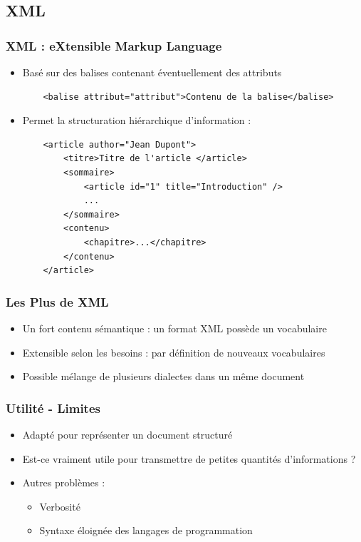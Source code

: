 \documentclass{beamer}
\begin{document}
    \subsection{XML}
        \begin{frame}[containsverbatim]
            \frametitle{XML : eXtensible Markup Language}
            \begin{itemize}
                \item \normalsize Basé sur des balises contenant éventuellement des attributs
                \footnotesize
                \begin{verbatim}    <balise attribut="attribut">Contenu de la balise</balise> \end{verbatim}
                \item \normalsize Permet la structuration hiérarchique d'information :
                \footnotesize
                \begin{verbatim}
    <article author="Jean Dupont">
        <titre>Titre de l'article </article>
        <sommaire>
            <article id="1" title="Introduction" />
            ...
        </sommaire>
        <contenu>
            <chapitre>...</chapitre>
        </contenu>
    </article>
                \end{verbatim}

            \end{itemize}
        \end{frame}

        \begin{frame}
            \frametitle{Les Plus de XML}
            \begin{itemize}
                \item Un fort contenu sémantique : un format XML possède un vocabulaire\pause
                \item Extensible selon les besoins : par définition de nouveaux vocabulaires\pause
                \item Possible mélange de plusieurs dialectes dans un même document
            \end{itemize}
        \end{frame}


        \begin{frame}
            \frametitle{Utilité - Limites}
            \begin{itemize}
                \item Adapté pour représenter un document structuré\pause
                \item Est-ce vraiment utile pour transmettre de petites quantités d'informations ?\pause
                \item Autres problèmes : 
                    \begin{itemize}
                        \item Verbosité
                        \item Syntaxe éloignée des langages de programmation
                    \end{itemize}
                
            \end{itemize}
        \end{frame}
\end{document}
